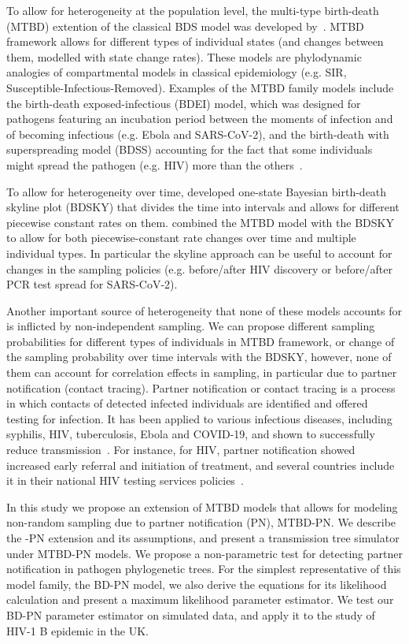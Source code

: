 \documentclass[a4paper,10pt]{article}
\begin{document}
To allow for heterogeneity at the population level, the multi-type birth-death (MTBD) extention of the classical BDS model was developed by~\citet{Stadler2013a}. MTBD framework allows for different types of individual states (and changes between them, modelled with state change rates). These models are phylodynamic analogies of compartmental models in classical epidemiology (e.g. SIR, Susceptible-Infectious-Removed).  Examples of the MTBD family models include the birth-death exposed-infectious (BDEI) model, which was designed for pathogens featuring an incubation period between the moments of infection and of becoming infectious (e.g. Ebola and SARS-CoV-2), and the birth-death with superspreading model (BDSS) accounting for the fact that some individuals might spread the pathogen (e.g. HIV) more than the others~\citep{Stadler2014}.

To allow for heterogeneity over time, \citet{Stadler2013} developed one-state Bayesian birth-death skyline plot (BDSKY) that divides the time into intervals and allows for different piecewise constant rates on them. \citet{Kuhnert2016} combined the MTBD model with the BDSKY to allow for both piecewise-constant rate changes over time and multiple individual types. In particular the skyline approach can be useful to account for changes in the sampling policies (e.g. before/after HIV discovery or before/after PCR test spread for SARS-CoV-2).


Another important source of heterogeneity that none of these models accounts for is inflicted by non-independent sampling. We can propose different sampling probabilities for different types of individuals in MTBD framework, or change of the sampling probability over time intervals with the BDSKY, however, none of them can account for correlation effects in sampling, in particular due to partner notification (contact tracing). Partner notification or contact tracing is a process in which contacts of detected infected individuals are identified and offered testing for infection. It has been applied to various infectious diseases, including syphilis, HIV, tuberculosis, Ebola and COVID-19, and shown to successfully reduce transmission~\citep{el-sadrContactTracingBarriers2022}. For instance, for HIV,  partner notification showed increased early referral and initiation of treatment, and several countries include it in their national HIV testing services policies~\citep{worldhealthorganizationCountryPolicyReview2016}. 


In this study we propose an extension of MTBD models that allows for modeling non-random sampling due to partner notification (PN), MTBD-PN. We describe the -PN extension and its assumptions, and present a transmission tree simulator under MTBD-PN models. We propose a non-parametric test for detecting partner notification in pathogen phylogenetic trees. For the simplest representative of this model family, the BD-PN model, we also derive the equations for its likelihood calculation and present a maximum likelihood parameter estimator. We test our BD-PN parameter estimator on simulated data, and apply it to the study of HIV-1 B epidemic in the UK. 
\end{document}
